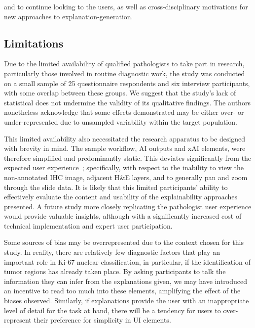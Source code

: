 and to continue looking to the users, as well as cross-disciplinary motivations for new approaches to explanation-generation.
  
\subsection{Limitations}

Due to the limited availability of qualified pathologists to take part in research, particularly those involved in routine diagnostic work, the study was conducted on a small sample of 25 questionnaire respondents and six interview participants, with some overlap between these groups. We suggest that the study's lack of statistical does not undermine the validity of its qualitative findings. The authors nonetheless acknowledge that some effects demonstrated may be either over- or under-represented due to unsampled variability within the target population. 

This limited availability also necessitated the research apparatus to be designed with brevity in mind. The sample workflow, AI outputs and xAI elements, were therefore simplified and predominantly static. This deviates significantly from the expected user experience~\cite{Kargl-et-al:2020:PathoWorkflows}; specifically, with respect to the inability to view the non-annotated IHC image, adjacent H\&E layers, and to generally pan and zoom through the slide data. It is likely that this limited participants' ability to effectively evaluate the content and usability of the explainability approaches presented. A future study more closely replicating the pathologist user experience would provide valuable insights, although with a significantly increased cost of technical implementation and expert user participation.

Some sources of bias may be overrepresented due to the context chosen for this study. In reality, there are relatively few diagnostic factors that play an important role in Ki-67 nuclear classification, in particular, if the identification of tumor regions has already taken place. By asking participants to talk the information they can infer from the explanations given, we may have introduced an incentive to read too much into these elements, amplifying the effect of the biases observed. Similarly, if explanations provide the user with an inappropriate level of detail for the task at hand, there will be a tendency for users to over-represent their preference for simplicity in UI elements.

